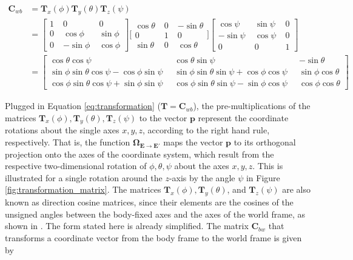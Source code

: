 \begin{equation}\label{eq:transformation_matrices}
\begin{split}
\mathbf{C}_{wb} & = \mathbf{T}_x(\phi) \mathbf{T}_y(\theta) \mathbf{T}_z(\psi) \\
 & = {\left[ \begin{smallmatrix}
    1 \; & 0 \; & 0 \\
    0 \; & \cos \phi \; & \sin \phi \\
    0 \; & -\sin \phi \; & \cos \phi
    \end{smallmatrix}\right]}
    {\bigg[ \begin{smallmatrix}
    \cos \theta \; & 0 \; & -\sin \theta \\
    0 \; & 1 \; & 0 \\
    \sin \theta \; & 0 \; & \cos \theta
    \end{smallmatrix} \bigg]}
    {\left[\begin{smallmatrix}
    \cos \psi \; & \sin \psi \; & 0 \\
    -\sin \psi \; & \cos \psi \; & 0 \\
    0 \; & 0 \; & 1
    \end{smallmatrix}\right]}\\
 & = {\left[\begin{smallmatrix}
   \cos \theta \cos \psi \; &
    \cos \theta \sin \psi \; &
   -\sin \theta \\
    \sin \phi \sin \theta \cos \psi - \cos \phi \sin \psi \;\; &
    \sin \phi \sin \theta \sin \psi + \cos \phi \cos \psi \;\; &
    \sin \phi \cos \theta \\
    \cos \phi \sin \theta \cos \psi + \sin \phi \sin \psi \;\; &
    \cos \phi \sin \theta \sin \psi - \sin \phi \cos \psi \;\; &
    \cos \phi \cos \theta
  \end{smallmatrix}\right]}
\end{split}
\end{equation}

\noindent
Plugged in Equation \ref{eq:transformation} ($\mathbf{T} = \mathbf{C}_{wb}$), the pre-multiplications of the matrices $\mathbf{T}_x(\phi), \mathbf{T}_y(\theta), \mathbf{T}_z(\psi)$ to the vector $\mathbf{p}$ represent the coordinate rotations about the single axes $x, y, z$, according to the right hand rule, respectively. That is, the function $\bm{\Omega}_{\mathbf{E} \rightarrow \mathbf{E}'}$ maps the vector $\mathbf{p}$ to its orthogonal projection onto the axes of the coordinate system, which result from the respective two-dimensional rotation of $\phi, \theta, \psi$ about the axes $x, y, z$. This is illustrated for a single rotation around the $z$-axis by the angle $\psi$ in Figure \ref{fig:transformation_matrix}. The matrices $\mathbf{T}_x(\phi), \mathbf{T}_y(\theta)$, and $\mathbf{T}_z(\psi)$ are also known as direction cosine matrices, since their elements are the cosines of the unsigned angles between the body-fixed axes and the axes of the world frame, as shown in \cite{diebel2006attitude}. The form stated here is already simplified. The matrix $\mathbf{C}_{bw}$ that transforms a coordinate vector from the body frame to the world frame is given by

